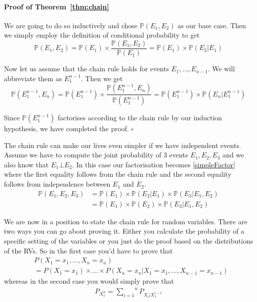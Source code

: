 \paragraph{Proof of Theorem~\ref{thm:chain}} We are going to do so inductively and chose $ \mathbb{P}(E_{1}, E_{2}) $ as our
base case. Then we simply employ the definition of conditional probability to get
\begin{equation}
\mathbb{P}(E_{1}, E_{2}) = \mathbb{P}(E_{1}) \times \dfrac{\mathbb{P}(E_{1}, E_{2})}{\mathbb{P}(E_{1})} = \mathbb{P}(E_{1}) \times \mathbb{P}(E_{2}|E_{1})
\end{equation}

Now let us assume that the chain rule holds for events $ E_{1}, \ldots, E_{n-1} $. We will abbreviate them as $ E_{1}^{n-1} $. Then we get
\begin{equation}
\mathbb{P}(E_{1}^{n-1}, E_{n}) = \mathbb{P}(E_{1}^{n-1}) \times \dfrac{\mathbb{P}(E_{1}^{n-1}, E_{n})}{\mathbb{P}(E_{1}^{n-1})} 
= \mathbb{P}(E_{1}^{n-1}) \times \mathbb{P}(E_{n}|E_{1}^{n-1})
\end{equation}

Since $ \mathbb{P}(E_{1}^{n-1}) $ factorises according to the chain
rule by our induction hypothesis, we have completed the proof.
$ \square $\bigskip

The chain rule can make our lives even simpler if we have independent events. Assume we have to compute the joint probability of 3 events 
$ E_{1},E_{2},E_{3} $ and we also know that $ E_{1} \bot E_{2} $. In this case our factorisation becomes \ref{simpleFactor} where
the first equality follows from the chain rule and the second equality follows from independence between $ E_{1} $ and $ E_{2} $.
\begin{align} \label{simpleFactor}
\mathbb{P}(E_{1}, E_{2}, E_{3}) &= \mathbb{P}(E_{1}) \times \mathbb{P}(E_{2}|E_{1}) \times \mathbb{P}(E_{3}|E_{1},E_{2}) \\
&= \mathbb{P}(E_{1}) \times \mathbb{P}(E_{2}) \times \mathbb{P}(E_{3}|E_{1},E_{2}) \nonumber
\end{align}

We are now in a position to state the chain rule for random variables. There are two ways you can go about proving it. Either you 
calculate the probability of a specific setting of the variables or you just do the proof based on the distributions of the RVs.
So in the first case you'd have to prove that 
\begin{align*}
&P(X_{1} = x_{1}, \ldots, X_{n} = x_{n}) \\
&= P(X_{1} = x_{1}) \times \ldots \times P(X_{n} = x_{n}|X_{1}=x_{1}, \ldots, X_{n-1} = x_{n-1})
\end{align*}
whereas in the second case you would simply prove that
\begin{align*}
P_{X_{1}^{n}} = \overset{n}{\underset{i=1}{\sum}}P_{X_{i}|X_{1}^{i-1}}
\end{align*}

